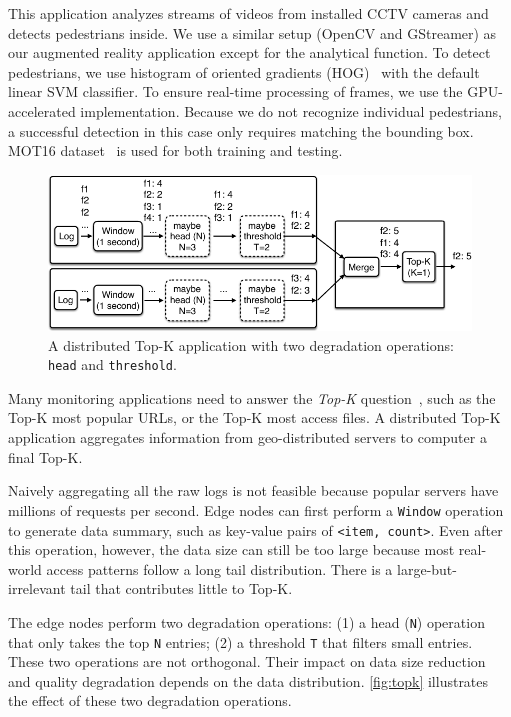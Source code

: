  This application analyzes streams of videos from
installed CCTV cameras and detects pedestrians inside. We use a similar setup
(OpenCV and GStreamer) as our augmented reality application except for the
analytical function. To detect pedestrians, we use histogram of oriented
gradients (HOG)~\cite{dalal2005histograms} with the default linear SVM
classifier. To ensure real-time processing of frames, we use the GPU-accelerated
implementation. Because we do not recognize individual pedestrians, a successful
detection in this case only requires matching the bounding box.  MOT16
dataset~\cite{milan2016mot16} is used for both training and testing.

\begin{figure}
  \centering
  \includegraphics[width=\columnwidth]{figures/topk.pdf}
  \caption{A distributed Top-K application with two degradation operations:
    \texttt{head} and \texttt{threshold}.}
  \label{fig:topk}
\end{figure}


 Many monitoring applications need to answer the
\textit{Top-K} question~\cite{babcock2003distributed}, such as the Top-K most
popular URLs, or the Top-K most access files. A distributed Top-K application
aggregates information from geo-distributed servers to computer a final Top-K.

Naively aggregating all the raw logs is not feasible because popular servers
have millions of requests per second. Edge nodes can first perform a
\texttt{Window} operation to generate data summary, such as key-value pairs of
\texttt{<item, count>}. Even after this operation, however, the data size can
still be too large because most real-world access patterns follow a long tail
distribution. There is a large-but-irrelevant tail that contributes little to
Top-K.

The edge nodes perform two degradation operations: (1) a head (\texttt{N})
operation that only takes the top \texttt{N} entries; (2) a threshold \texttt{T}
that filters small entries. These two operations are not orthogonal. Their
impact on data size reduction and quality degradation depends on the data
distribution. \autoref{fig:topk} illustrates the effect of these two degradation
operations.

